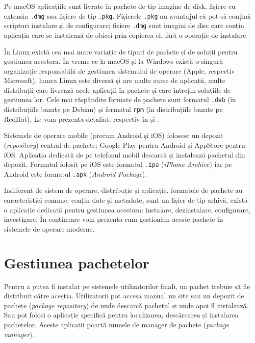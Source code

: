 Pe macOS aplicațiile sunt livrate în pachete de tip imagine de disk, fișiere cu extensia \texttt{.dmg} sau fișiere de tip \texttt{.pkg}. Fișierele \texttt{.pkg} au avantajul că pot să conțină scripturi instalare și de configurare; fișiere \texttt{.dmg} sunt imagini de disc care conțin aplicația care se instalează de obicei prin copierea ei, fără o operație de instalare.

În Linux există cea mai mare variație de tipuri de pachete și de soluții pentru gestiunea acestora. În vreme ce la macOS și la Windows există o singură organizație responsabilă de gestiunea sistemului de operare (Apple, respectiv Microsoft), lumea Linux este diversă și are multe surse de aplicații, multe distribuții care livrează acele aplicații în pachete și care întrețin soluțiile de gestiunea lor. Cele mai răspândite formate de pachete sunt formatul \texttt{.deb} (în distribuțiile bazate pe Debian) și formatul \texttt{rpm} (în distribuțiile bazate pe RedHat). Le vom prezenta detaliat, respectiv în  și .

Sistemele de operare mobile (precum Android și iOS) folosesc un depozit (\textit{repository}) central de pachete: Google Play pentru Android și AppStore pentru iOS. Aplicația dedicată de pe telefonul mobil descarcă și instalează pachetul din depozit. Formatul folosit pe iOS este formatul \texttt{.ipa} (\textit{iPhone Archive}) iar pe Android este formatul \texttt{.apk} (\textit{Android Package}).

Indiferent de sistem de operare, distribuție și aplicație, formatele de pachete au caracteristici comune: conțin date și metadate, sunt un fișier de tip arhivă, există o aplicație dedicată pentru gestiunea acestora: instalare, dezinstalare, configurare, investigare. În continuare vom prezenta cum gestionăm aceste pachete în sistemele de operare moderne.

\section{Gestiunea pachetelor}
\label{sec:package:manage}

Pentru a putea fi instalat pe sistemele utilizatorilor finali, un pachet trebuie să fie distribuit către aceștia. Utilizatorii pot accesa manual un site sau un depozit de pachete (\textit{package repository}) de unde descarcă pachetul și unde apoi îl instalează. Sau pot folosi o aplicație specifică pentru localizarea, descărcarea și instalarea pachetelor. Aceste aplicații poartă numele de manager de pachete (\textit{package manager}).

